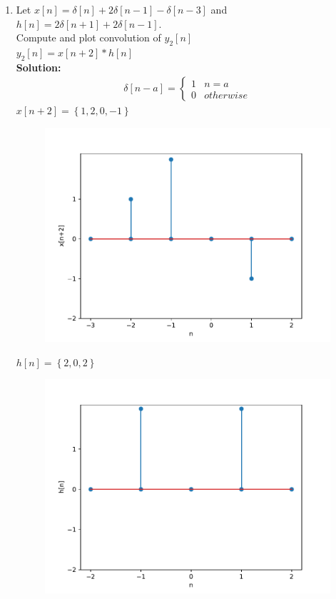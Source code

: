 \documentclass[journal,12pt,twocolumn]{IEEEtran}
\newcommand{\solution}{\noindent \textbf{Solution: }}
\providecommand{\cbrak}[1]{\ensuremath{\left\{#1\right\}}}
\providecommand{\sbrak}[1]{\ensuremath{\left[#1\right]}}
\numberwithin{equation}{section}
\begin{document}
\begin{enumerate}[label=\arabic*]
\item Let $x\sbrak{n} = \delta\sbrak{n} + 2\delta\sbrak{n-1}-\delta\sbrak{n-3}$ and
$h\sbrak{n} =2\delta\sbrak{n+1}+2\delta\sbrak{n-1} $.\\
Compute and plot convolution of $y_2\sbrak{n}$\\ $y_2\sbrak{n} = x\sbrak{n+2}*h\sbrak{n}$\\
\solution \\
\begin{align}
\delta\sbrak{n-a}=
\begin{cases}
1 & n=a\\
0 & otherwise
\end{cases}
\end{align}
$x\sbrak{n+2} = \cbrak{1,2,0,-1}$\\
\begin{figure}[!ht]
\centering
\includegraphics[width=\columnwidth]{./figs/x[n+2]}
\label{fig:x[n+2]}
\end{figure}
$h\sbrak{n} = \cbrak{2,0,2}$
\begin{figure}[!ht]
\centering
\includegraphics[width=\columnwidth]{./figs/h[n]}

\end{figure}
\end{enumerate}
\end{document}
